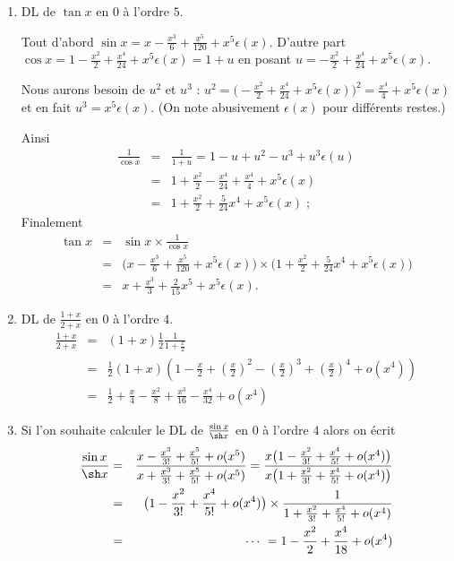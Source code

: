 \documentclass[class=report,crop=false]{standalone}
\begin{document}
\begin{exemple}
\sauteligne
\begin{enumerate}
  \item DL de $\tan x$ en $0$ à l'ordre $5$.

Tout d'abord
$\sin x=x-\frac{x^3}{6}+\frac{x^5}{120}+x^5\epsilon(x)$.
D'autre part
 $\cos  x=1-\frac{x^2}{2}+\frac{x^4}{24} +x^5\epsilon(x)=1+u$
en posant $u= -\frac{x^2}{2}+\frac{x^4}{24} +x^5\epsilon(x)$.

Nous aurons besoin de $u^2$ et $u^3$ :
$u^2 = \big(-\frac{x^2}{2}+\frac{x^4}{24} +x^5\epsilon(x)\big)^2
= \frac{x^4}{4}+x^5\epsilon(x)$ et en fait $u^3 = x^5\epsilon(x)$.
(On note abusivement $\epsilon(x)$ pour différents restes.)

Ainsi
\begin{eqnarray*}
\frac{1}{\cos x} 
  &=& \frac{1}{1+u} =1-u+u^2-u^3+u^3\epsilon(u) \\
  &=& 1+\frac{x^2}{2}-\frac{x^4}{24}+\frac{x^4}{4}+x^5\epsilon(x) \\
  &=& 1+\frac{x^2}{2}+\frac{5}{24}x^4+x^5\epsilon(x)\; ;
\end{eqnarray*}
Finalement
\begin{eqnarray*}
\tan x 
  &=& \sin x \times \frac1{\cos x} \\
  &=& \big(x-\frac{x^3}{6}+\frac{x^5}{120}+x^5\epsilon(x)\big)\times\big(1+\frac{x^2}{2}+\frac{5}{24}x^4+x^5\epsilon(x)\big) \\
  &=& x +\frac{x^3}{3}+\frac{2}{15}x^5+x^5\epsilon(x).
\end{eqnarray*}

  \item DL de $\frac{1+x}{2+x}$ en $0$ à l'ordre $4$.
\begin{eqnarray*}
\frac{1+x}{2+x} 
  &=& (1+x)\frac12\frac{1}{1+\frac{x}{2}} \\
  &=& \frac12(1+x) \left( 1-\frac{x}{2}+\left(\frac{x}{2}\right)^2-\left(\frac{x}{2}\right)^3
+\left( \frac{x}{2} \right)^4 + o(x^4) \right) \\
  &=& \frac12+\frac{x}{4}-\frac{x^2}{8}+\frac{x^3}{16}-\frac{x^4}{32} + o(x^4)
\end{eqnarray*}

  \item Si l'on souhaite calculer le DL de $\frac{\sin x}{\sh x}$ en $0$ à l'ordre $4$
alors on écrit
\begin{eqnarray*}
\frac{\sin x}{\sh x} &=&
\frac{x-\frac{x^3}{3!} + \frac{x^5}{5!}+ o(x^5)}{x+\frac{x^3}{3!} + \frac{x^5}{5!} + o(x^5)}
= \frac{x\big(1-\frac{x^2}{3!} + \frac{x^4}{5!}+ o(x^4)\big)}{x\big(1+\frac{x^2}{3!}+ \frac{x^4}{5!} + o(x^4)\big)}
\\
&=& \big(1-\frac{x^2}{3!}  + \frac{x^4}{5!}+ o(x^4)\big) \times \frac{1}{1+\frac{x^2}{3!}+ \frac{x^4}{5!} + o(x^4)}\\
&=& \cdots \  = 1-\frac{x^2}{2}+\frac{x^4}{18} + o(x^4)
\end{eqnarray*}
\end{enumerate}
\end{exemple}
\end{document}
